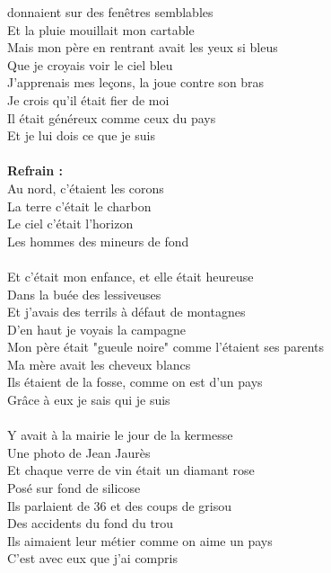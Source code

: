 
 donnaient sur des fenêtres semblables
\\Et la pluie mouillait mon cartable
\\Mais mon père en rentrant avait les yeux si bleus
\\Que je croyais voir le ciel bleu
\\J'apprenais mes leçons, la joue contre son bras
\\Je crois qu'il était fier de moi
\\Il était généreux comme ceux du pays
\\Et je lui dois ce que je suis
\\\\\textbf{Refrain :}
\\Au nord, c'étaient les corons
\\La terre c'était le charbon
\\Le ciel c'était l'horizon
\\Les hommes des mineurs de fond
\\\\Et c'était mon enfance, et elle était heureuse
\\Dans la buée des lessiveuses
\\Et j'avais des terrils à défaut de montagnes
\\D'en haut je voyais la campagne
\\Mon père était "gueule noire" comme l'étaient ses parents
\\Ma mère avait les cheveux blancs
\\Ils étaient de la fosse, comme on est d'un pays
\\Grâce à eux je sais qui je suis
\\\\Y avait à la mairie le jour de la kermesse
\\Une photo de Jean Jaurès
\\Et chaque verre de vin était un diamant rose
\\Posé sur fond de silicose
\\Ils parlaient de 36 et des coups de grisou
\\Des accidents du fond du trou
\\Ils aimaient leur métier comme on aime un pays
\\C'est avec eux que j'ai compris


\breakpage